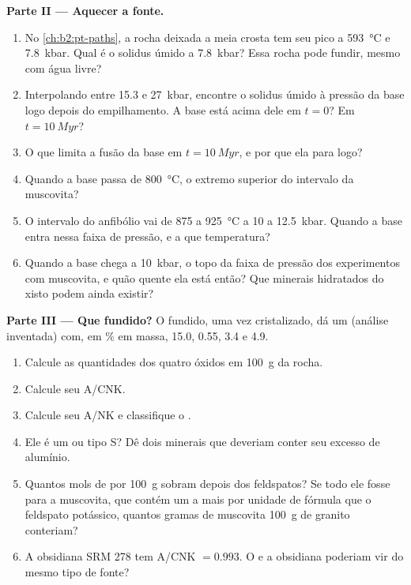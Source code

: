 \begin{problem}
\noindent\textbf{Parte II --- Aquecer a fonte.}
\begin{enumerate}[resume]
\item No \cref{ch:b2:pt-paths}, a rocha deixada a meia crosta tem seu pico a \qty{593}{\celsius}
e \qty{7.8}{kbar}. Qual é o solidus úmido a \qty{7.8}{kbar}? Essa rocha pode fundir, mesmo
com água livre?
\item Interpolando entre 15.3 e \qty{27}{kbar}, encontre o solidus úmido à pressão
da base logo depois do empilhamento. A base está acima dele em $t = 0$? Em $t = \qty{10}{Myr}$?
\item O que limita a fusão da base em $t = \qty{10}{Myr}$, e por que ela para
logo?
\item Quando a base passa de \qty{800}{\celsius}, o extremo superior do intervalo da
muscovita?
\item O intervalo do anfibólio vai de 875 a \qty{925}{\celsius} a 10 a \qty{12.5}{kbar}.
Quando a base entra nessa faixa de pressão, e a que temperatura?
\item Quando a base chega a \qty{10}{kbar}, o topo da faixa de pressão dos
experimentos com muscovita, e quão quente ela está então? Que minerais hidratados do xisto podem
ainda existir?
\end{enumerate}

\noindent\textbf{Parte III --- Que fundido?}
O fundido, uma vez cristalizado, dá um  (análise inventada) com, em
\unit{\percent} em massa,  15.0,  0.55,  3.4 e  4.9.
\begin{enumerate}[resume]
\item Calcule as quantidades dos quatro óxidos em \qty{100}{\gram} da rocha.
\item Calcule seu A/CNK.
\item Calcule seu A/NK e classifique o .
\item Ele é um  ou tipo S? Dê dois minerais que deveriam conter seu excesso
de alumínio.
\item Quantos mols de  por \qty{100}{\gram} sobram depois dos
feldspatos? Se todo ele fosse para a muscovita, que contém um  a mais por unidade de
fórmula que o feldspato potássico, quantos gramas de muscovita \qty{100}{\gram} de granito
conteriam?
\item A obsidiana SRM 278 tem A/CNK $= 0.993$. O  e a obsidiana poderiam
vir do mesmo tipo de fonte?
\end{enumerate}


\end{problem}
